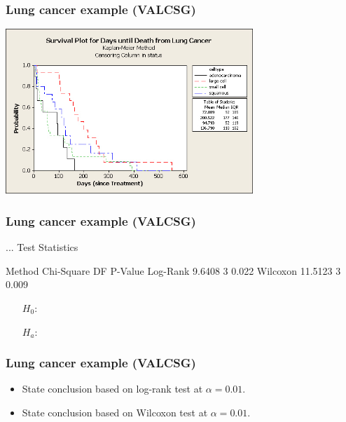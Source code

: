 \begin{frame}
\frametitle{Lung cancer example (VALCSG)}
\includegraphics[width=0.7\textwidth]{Figures/km_valcsg.jpg}
\end{frame}


\begin{frame}[fragile]
\frametitle{Lung cancer example (VALCSG)}
\begin{MTout}{.3}
...
Test Statistics

Method    Chi-Square  DF  P-Value
Log-Rank      9.6408   3    0.022
Wilcoxon     11.5123   3    0.009
\end{MTout}
\begin{itemize}
\item[$H_0$:]
\item[]
\item[]
\item[]
\item[$H_a$:]
\item[]
\item[]
\item[]
\end{itemize}
\end{frame}


\begin{frame}
\frametitle{Lung cancer example (VALCSG)}
\begin{itemize}
\item State conclusion based on log-rank test at $\alpha = 0.01$.
\item[]
\item[]
\item[]
\item[]
\item[]
\item State conclusion based on Wilcoxon test at $\alpha = 0.01$.
\item[]
\item[]
\item[]
\item[]
\item[]
\end{itemize}
\end{frame}

